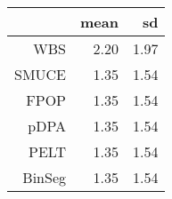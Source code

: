 \begin{tabular}{rrr}
  \hline
 & mean & sd \\ 
  \hline
WBS & 2.20 & 1.97 \\ 
  SMUCE & 1.35 & 1.54 \\ 
  FPOP & 1.35 & 1.54 \\ 
  pDPA & 1.35 & 1.54 \\ 
  PELT & 1.35 & 1.54 \\ 
  BinSeg & 1.35 & 1.54 \\ 
   \hline
\end{tabular}
